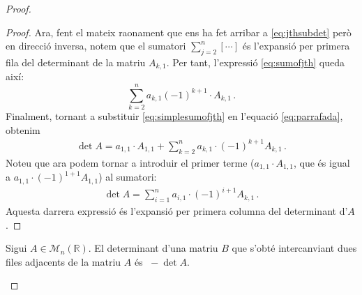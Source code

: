 \begin{teo}
\begin{proof}
\begin{lema}
\begin{adjustwidth}{0.8cm}{}
\begin{proof}
		Ara, fent el mateix raonament que ens ha fet arribar a \eqref{eq:jthsubdet} però en direcció inversa, notem que el sumatori $\sum_{j=2}^{n}[\cdots]$ és l'expansió per primera fila del determinant de la matriu $A_{k,1}$. Per tant, l'expressió \eqref{eq:sumofjth} queda així:
		\begin{equation}\label{eq:simplesumofjth}
			\sum_{k=2}^{n} a_{k,1} (-1)^{k+1} \cdot A_{k,1} \,.
		\end{equation}
		Finalment, tornant a substituir \eqref{eq:simplesumofjth} en l'equació \eqref{eq:parrafada}, obtenim
		\begin{equation}
		\begin{split}
		\det A = a_{1,1}\cdot A_{1,1}
		+\sum_{k=2}^{n} a_{k,1}\cdot (-1)^{k+1} A_{k,1}\,.
		\end{split}
		\end{equation}
		Noteu que ara podem tornar a introduir el primer terme ($a_{1,1}\cdot A_{1,1}$, que és igual a $a_{1,1}\cdot(-1)^{1+1} A_{1,1}$) al sumatori:
		\begin{equation}
		\begin{split}
		\det A = \sum_{i=1}^{n} a_{i,1}\cdot (-1)^{i+1} A_{k,1}\,.
		\end{split}
		\end{equation}
		Aquesta darrera expressió és l'expansió per primera columna del determinant d'$A$.
		\end{proof}
		\end{adjustwidth}
	\end{lema}
%
\vspace{5mm}
%
\begin{lema}\label{lema:intercanvi}
		Sigui $A \in \mathcal{M}_n(\mathbb{R})$. El determinant d'una matriu $B$ que s'obté intercanviant dues files adjacents de la matriu $A$ és $\;-\det A$.
		

\end{lema}
\end{proof}
\end{teo}
